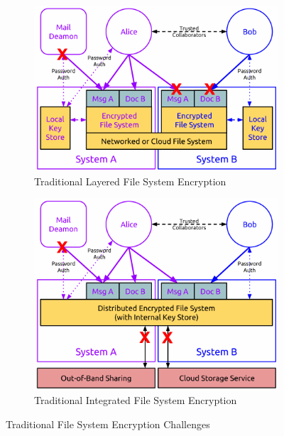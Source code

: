\begin{figure}[!tb]
  \vspace{5ex}
  \begin{center}
    \begin{subfigure}{\textwidth}
      \begin{center}
        \includegraphics[width=.5\textwidth]
                        {./figs/pdf/FS-Traditional-Layered.pdf}
        \caption{Traditional Layered File System Encryption}
        \label{fig:FS-traditional-layered}
      \end{center}
    \end{subfigure}
    \begin{subfigure}{\textwidth}
      \begin{center}
        \includegraphics[width=.5\textwidth]
                        {./figs/pdf/FS-Traditional-Integrated.pdf}
        \caption{Traditional Integrated File System Encryption}
        \label{fig:FS-traditional-integrated}
      \end{center}
    \end{subfigure}
  \end{center}
  \caption{Traditional File System Encryption Challenges}
  \label{fig:FS-traditional}
\end{figure}

